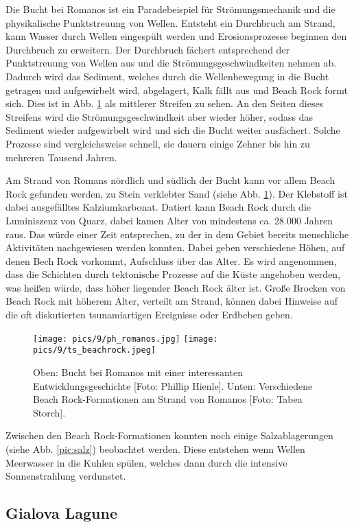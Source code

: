 \documentclass[preprint]{geomorphica} %
\begin{document}
Die Bucht bei Romanos ist ein Paradebeispiel für Strömungsmechanik und die physikalische Punktstreuung von Wellen. Entsteht ein Durchbruch am Strand, kann Wasser durch Wellen eingespült werden und Erosionsprozesse beginnen den Durchbruch zu erweitern. Der Durchbruch fächert entsprechend der Punktstreuung von Wellen aus und die Strömungsgeschwindkeiten nehmen ab. Dadurch wird das Sediment, welches durch die Wellenbewegung in die Bucht getragen und aufgewirbelt wird, abgelagert, Kalk fällt aus und Beach Rock formt sich. Dies ist in Abb. \ref{pic:romanos} als mittlerer Streifen zu sehen. An den Seiten dieses Streifens wird die Strömungsgeschwindkeit aber wieder höher, sodass das Sediment wieder aufgewirbelt wird und sich die Bucht weiter ausfächert. Solche Prozesse sind vergleichsweise schnell, sie dauern einige Zehner bis hin zu mehreren Tausend Jahren.

Am Strand von Romans nördlich und südlich der Bucht kann vor allem Beach Rock gefunden werden, zu Stein verklebter Sand (siehe Abb. \ref{pic:romanos}). Der Klebstoff ist dabei ausgefälltes Kalziumkarbonat. Datiert kann Beach Rock durch die Luminiszenz von Quarz, dabei kamen Alter von mindestens ca. 28.000 Jahren raus. Das würde einer Zeit entsprechen, zu der in dem Gebiet bereits menschliche Aktivitäten nachgewiesen werden konnten. Dabei geben verschiedene Höhen, auf denen Bech Rock vorkommt, Aufschluss über das Alter. Es wird angenommen, dass die Schichten durch tektonische Prozesse auf die Küste angehoben werden, was heißen würde, dass höher liegender Beach Rock älter ist. Große Brocken von Beach Rock mit höherem Alter, verteilt am Strand, können dabei Hinweise auf die oft diskutierten tsunamiartigen Ereignisse oder Erdbeben geben.

\begin{figure}[h]
    \centering
    \texttt{[image: pics/9/ph\_romanos.jpg]}
    \texttt{[image: pics/9/ts\_beachrock.jpeg]}
    \caption{Oben: Bucht bei Romanos mit einer interessanten Entwicklungsgeschichte [Foto: Phillip Hienle]. Unten: Verschiedene Beach Rock-Formationen am Strand von Romanos [Foto: Tabea Storch].}
    \label{pic:romanos}
\end{figure}

Zwischen den Beach Rock-Formationen konnten noch einige Salzablagerungen (siehe Abb. \ref{pic:salz}) beobachtet werden. Diese entstehen wenn Wellen Meerwasser in die Kuhlen spülen, welches dann durch die intensive Sonnenstrahlung verdunstet.

\subsection{Gialova Lagune}
\label{sec:gialova}
\end{document}
